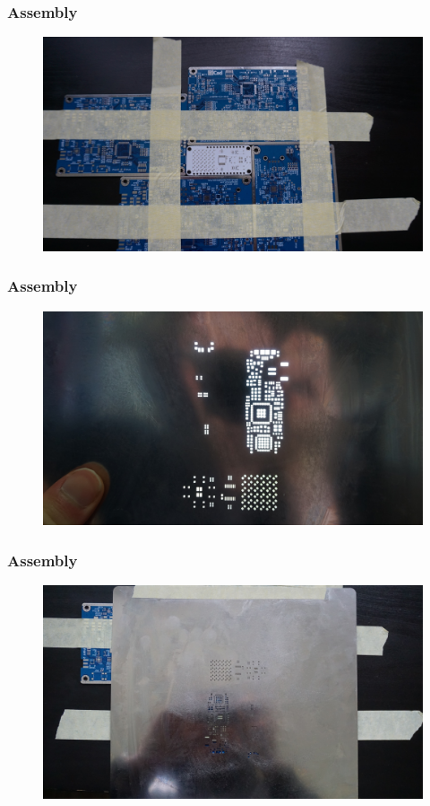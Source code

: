 \documentclass[t]{beamer}
\begin{document}
\begin{frame}
\frametitle{Assembly}
\begin{figure}
	\includegraphics[width=\linewidth]{assembly/assm0.JPG}
\end{figure}
\end{frame}
\begin{frame}
\frametitle{Assembly}
\begin{figure}
	\includegraphics[width=\linewidth]{assembly/assm1.JPG}
\end{figure}
\end{frame}
\begin{frame}
\frametitle{Assembly}
\begin{figure}
	\includegraphics[width=\linewidth]{assembly/assm2.JPG}
\end{figure}
\end{frame}
\end{document}
